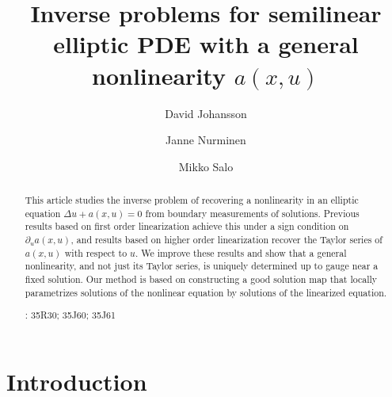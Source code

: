 \documentclass[11pt,a4paper]{amsart}
\theoremstyle{definition}
\numberwithin{equation}{section}
\newcommand{\p}{\partial}
\begin{document}
\title{Inverse problems for semilinear elliptic PDE with a general nonlinearity $a(x,u)$} 

\author[D. Johansson]{David Johansson}
\address{Department of Mathematics, Aarhus University}

\author[J. Nurminen]{Janne Nurminen}
\address{Computational Engineering, School of Engineering Sciences, Lappeenranta-Lahti University of Technology, Finland \& Department of Mathematics and Statistics, University of Jyväskylä, Jyväskylä, Finland}

\author[M. Salo]{Mikko Salo}
\address{Department of Mathematics and Statistics, University of Jyäskylä}










\begin{abstract}
This article studies the inverse problem of recovering a nonlinearity in an elliptic equation $\Delta u + a(x,u) = 0$ from boundary measurements of solutions. Previous results based on first order linearization achieve this under a sign condition on $\p_u a(x,u)$, and results based on higher order linearization recover the Taylor series of $a(x,u)$ with respect to $u$. We improve these results and show that a general nonlinearity, and not just its Taylor series, is uniquely determined up to gauge near a fixed solution. Our method is based on constructing a good solution map that locally parametrizes solutions of the nonlinear equation by solutions of the linearized equation.

\medskip
		
: 35R30; 35J60; 35J61
\end{abstract}

\maketitle

\section{Introduction}
\end{document}
